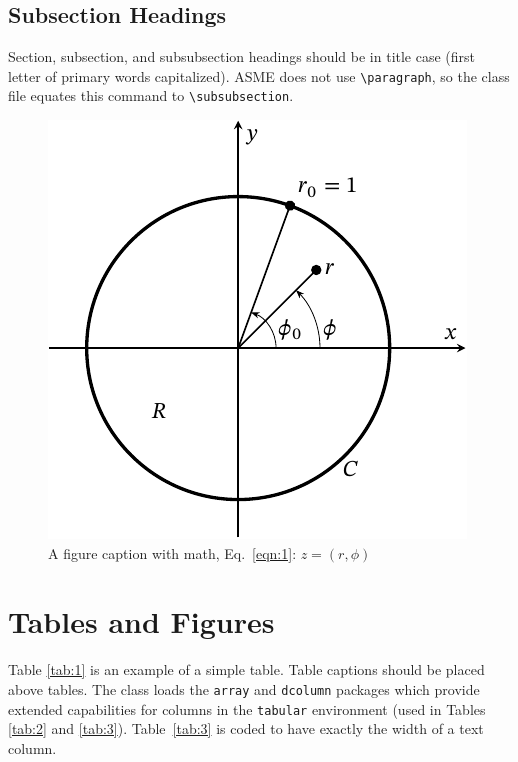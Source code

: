 \documentclass[subscriptcorrection,upint,varvw,mathalfa=cal=euler,barcolor=black,balance,hyphenate,french,pdf-a,nolists]{asmejour}
\begin{document}
\subsection{Subsection Headings}
Section, subsection, and subsubsection headings should be in title case (first letter of primary words capitalized). ASME does not use \verb|\paragraph|, so the class file equates this command to \verb|\subsubsection|.



\begin{figure}
\centering\includegraphics[width=0.7\linewidth]{figures/sample-figure-1.pdf}
\caption{A figure caption with math, Eq.~\eqref{eqn:1}: $z = (r,\phi)$ \cite{Lienhard2019b}\label{fig:1}}
\end{figure}



\section{Tables and Figures}

Table \ref{tab:1} is an example of a simple table. Table captions should be placed above tables.
The class loads the \texttt{array} and \texttt{dcolumn} packages which provide extended capabilities for columns in the \texttt{tabular} environment (used in Tables \ref{tab:2} and \ref{tab:3}). Table~\ref{tab:3} is coded to have exactly the width of a text column.
\end{document}
